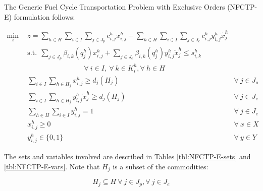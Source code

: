 The Generic Fuel Cycle Transportation Problem with Exclusive Orders (NFCTP-E)
formulation follows:

\begin{subequations}\label{eqs:NFCTP-E}
  \begin{align}
    \label{eq:GRCTP-E_obj}
    \min_{z} \:\: 
    & 
    z = \sum_{h \in H}\sum_{i \in I}\sum_{j \in J_{p}}c_{i,j}^{h} x_{i,j}^{h} 
    + \sum_{h \in H}\sum_{i \in I}\sum_{j \in J_{e}}c_{i,j}^{h} y_{i,j}^{h} \tilde{x}_{j}^{h}
    && \\
    \label{eq:GRCTP-E_sup}
    &
    \text{s.t.} \:\: 
    \sum_{j \in J_{p}}\beta_{i,k}(q_{j}^{h}) x_{i,j}^{h}
    + \sum_{j \in J_{e}}\beta_{i,k}(q_{j}^{h}) y_{i,j}^{h} \tilde{x}_{j}^{h} \leq s_{i,k}^{h} \nonumber \\
    &
    \qquad\qquad\qquad\qquad
    \forall \: i \in I, \: \forall \: k \in K_{i}^{h}, \forall \: {h \in H}\\
    \label{eq:GRCTP-E_dem_p}
    &
    \sum_{i \in I}\sum_{h \in H_{j}} x_{i,j}^{h} \geq d_{j}(H_{j})
    &
    \forall \: j \in J_{o} &\\
    \label{eq:GRCTP-E_dem_e}
    &
    \sum_{i \in I}\sum_{h \in H_{j}} y_{i,j}^{h} \tilde{x}_{j}^{h} \geq d_{j}(H_{j}) 
    &
    \forall \: j \in J_{e}  &\\
    \label{eq:GRCTP-E_sumy}
    &
    \sum_{h \in H}\sum_{i \in I} y_{i,j}^{h} = 1
    &
    \forall \: j \in J_{e}  &\\
    \label{eq:GRCTP-E_x}
    &
    x_{i,j}^{h} \geq 0
    &
    \forall \: x \in X  &\\
    \label{eq:GRCTP-E_y}
    &
    y_{i,j}^{h} \in \{0,1\}
    &
    \forall \: y \in Y &
  \end{align}
\end{subequations}

The sets and variables involved are described in Tables \ref{tbl:NFCTP-E-sets}
and \ref{tbl:NFCTP-E-vars}. Note that $H_{j}$ is a subset of the commodities:

\begin{equation}
  H_{j} \subseteq H \: \forall \: j \in J_{p}, \forall \: j \in J_{e}
\end{equation}

